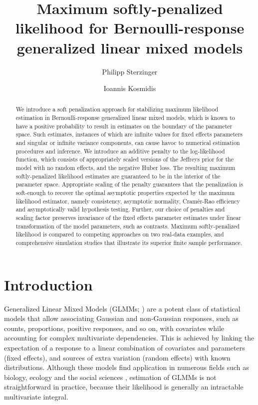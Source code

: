 \documentclass[11pt, a4paper]{article}
\title{Maximum softly-penalized likelihood for Bernoulli-response generalized linear mixed models}
\author[1]{Philipp Sterzinger}
\author[1,2]{Ioannis Kosmidis}
\affil[1]{Department of Statistics, University of Warwick, Coventry, CV4 7AL, UK}
\affil[2]{The Alan Turing Institute, London, NW1 2DB, UK}
\theoremstyle{example} \newtheorem{example}{Example}[section]
\theoremstyle{theorem} \newtheorem{theorem}{Theorem}[section]
\begin{document}
\maketitle

\begin{abstract}
  We introduce a soft penalization approach for stabilizing maximum
  likelihood estimation in Bernoulli-response generalized linear mixed
  models, which is known to have a positive probability to result in
  estimates on the boundary of the parameter space. Such estimates, instances of which
  are infinite values for fixed effects parameters and singular or
  infinite variance components, can cause havoc to numerical
  estimation procedures and inference. We introduce an additive penalty to the log-likelihood function, 
  which consists of appropriately scaled versions of the Jeffreys
  prior for the model with no random effects, and the negative Huber loss. The resulting maximum softly-penalized likelihood
  estimates are guaranteed to be in the interior of the parameter
  space. Appropriate scaling of the penalty guarantees that the penalization is soft-enough to recover
  the optimal asymptotic properties expected by the maximum likelihood
  estimator, namely consistency, asymptotic normality,
  Cram\'{e}r-Rao efficiency and asymptotically valid hypothesis testing. Further, our choice of penalties and scaling factor preserves invariance of the fixed effects parameter estimates under linear transformation of the model
  parameters, such as contrasts. Maximum softly-penalized likelihood
  is compared to competing approaches on two real-data examples,
  and comprehensive simulation studies that illustrate its superior finite sample
  performance.
  \bigskip \\
\end{abstract}

\section{Introduction}
\label{sec:intro}

Generalized Linear Mixed Models (GLMMs; \citealt[Chapter
7]{mcculloch2004generalized}) are a potent class of statistical models
that allow associating Gaussian and non-Gaussian responses, such as
counts, proportions, positive responses, and so on, with covariates
while accounting for complex multivariate dependencies. This is achieved by linking
the expectation of a response to a linear combination of covariates
and parameters (fixed effects), and sources of extra variation (random
effects) with known distributions. Although these models find
application in numerous fields such as biology, ecology and the social
sciences \citep{bolker2009generalized}, estimation of GLMMs is not
straightforward in practice, because their likelihood is generally an intractable
multivariate integral.
\end{document}
